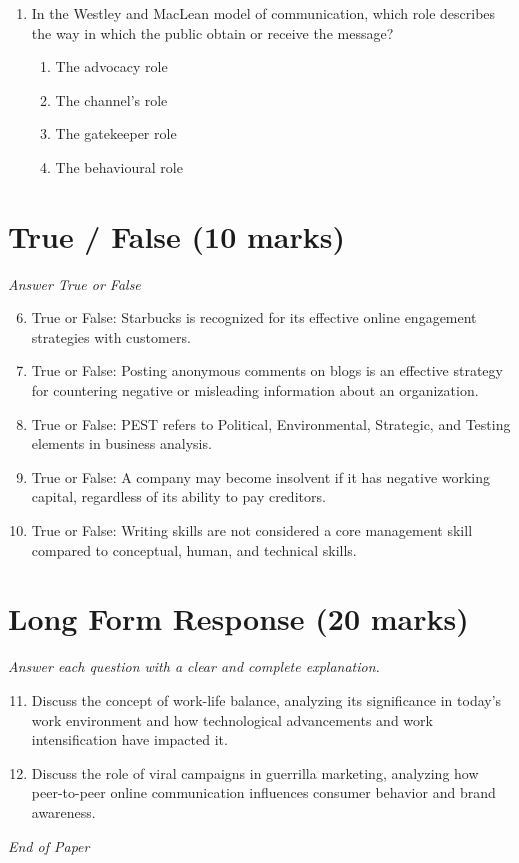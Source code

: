 \documentclass[12pt]{article}
\begin{document}
\begin{enumerate}[label=\arabic*.]
\begin{enumerate}[label=(\alph*)]
    \item Conceptual equivalence.
    \item Market equivalence.
    \item Functional equivalence.
    \item Translation equivalence.
\end{enumerate}
\item In the Westley and MacLean model of communication, which role describes the way in which the public obtain or receive the message?
\begin{enumerate}[label=(\alph*)]
    \item The advocacy role
    \item The channel's role
    \item The gatekeeper role
    \item The behavioural role
\end{enumerate}
\end{enumerate}

\section*{True / False (10 marks)}
\textit{Answer True or False}
\begin{enumerate}[label=\arabic*.]
\setcounter{enumi}{5}
\item True or False: Starbucks is recognized for its effective online engagement strategies with customers.
\item True or False: Posting anonymous comments on blogs is an effective strategy for countering negative or misleading information about an organization.
\item True or False: PEST refers to Political, Environmental, Strategic, and Testing elements in business analysis.
\item True or False: A company may become insolvent if it has negative working capital, regardless of its ability to pay creditors.
\item True or False: Writing skills are not considered a core management skill compared to conceptual, human, and technical skills.
\end{enumerate}

\section*{Long Form Response (20 marks)}
\textit{Answer each question with a clear and complete explanation.}
\begin{enumerate}[label=\arabic*.]
\setcounter{enumi}{10}
\item Discuss the concept of work-life balance, analyzing its significance in today's work environment and how technological advancements and work intensification have impacted it.
\item Discuss the role of viral campaigns in guerrilla marketing, analyzing how peer-to-peer online communication influences consumer behavior and brand awareness.
\end{enumerate}

\vfill
\noindent\textit{End of Paper}
\end{document}

